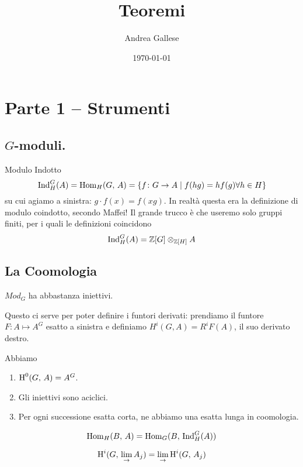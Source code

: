 \documentclass[a4paper]{article}
\title{Teoremi}\let\Title\@title
\author{Andrea Gallese}\let\Author\@author
\date{\today}\let\Date\@date
\begin{document}
	\section{Parte 1 -- Strumenti}
	
	\subsection{$ G $-moduli.}
	\begin{definition}{Modulo Indotto}
		\[ \operatorname{Ind}_H^G(A) = \operatorname{Hom}_H(G, \, A) = \{ f \colon G \to A \mid f(hg) = h f(g) \forall h \in H \} \]
		su cui agiamo a sinistra: $ g \cdot f(x) = f(xg) $. In realtà questa era la definizione di modulo coindotto, secondo Maffei! Il grande trucco è che useremo solo gruppi finiti, per i quali le definizioni coincidono
		\[ \operatorname{Ind}_H^G(A) = \mathbb{Z}[G] \otimes_{\mathbb{Z}[H]} A \]
	\end{definition}

	\subsection{La Coomologia}
	\begin{theorem}
		$ Mod_G $ ha abbastanza iniettivi.
	\end{theorem}

	Questo ci serve per poter definire i funtori derivati: prendiamo il funtore $ F \colon A \mapsto A^G $ esatto a sinistra e definiamo $ H^i(G, A) = R^iF(A) $, il suo derivato destro.
	
	\begin{theorem}
		Abbiamo
		\begin{enumerate}
			\item $ \operatorname{H}^0(G,\, A) = A^G $.
			\item Gli iniettivi sono aciclici.
			\item Per ogni successione esatta corta, ne abbiamo una esatta lunga in coomologia.
		\end{enumerate}
	\end{theorem}

	\begin{theorem}
		\[ \operatorname{Hom}_H(B,\, A) = \operatorname{Hom}_G(B, \, \operatorname{Ind}_H^G(A)) \]
	\end{theorem}

	\begin{theorem}
		\[ \operatorname{H}^i(G, \, \lim_{\rightarrow} A_j) =  \lim_{\rightarrow}\operatorname{H}^i(G, \, A_j) \]
	\end{theorem}
\end{document}
